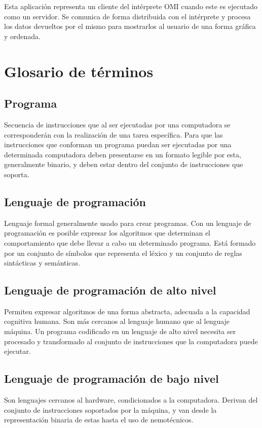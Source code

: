 Esta aplicación representa un cliente del intérprete OMI cuando este es ejecutado como un servidor. Se comunica de forma distribuida con el intérprete y procesa los datos devueltos por el mismo
para mostrarlos al usuario de una forma gráfica y ordenada.   

\section{Glosario de términos}
\subsection{Programa}
Secuencia de instrucciones que al ser ejecutadas por una computadora se corresponderán con
la realización de una tarea específica. Para que las instrucciones que conforman un programa puedan ser ejecutadas 
por una determinada computadora deben presentarse en un formato legible por esta, generalmente binario, y deben estar dentro
del conjunto de instrucciones que soporta. 

\subsection{Lenguaje de programación}
Lenguaje formal generalmente usado para crear programas. Con un lenguaje de programación es posible expresar los 
algoritmos que determinan el comportamiento que debe llevar a cabo un determinado programa. Está formado por
un conjunto de símbolos que representa el léxico y un conjunto de reglas sintácticas y semánticas. 

\subsection{Lenguaje de programación de alto nivel}
Permiten expresar algoritmos de una forma abstracta, adecuada a la capacidad cognitiva humana. Son más cercanos
al lenguaje humano que al lenguaje máquina. Un programa codificado en un lenguaje de alto nivel necesita ser procesado 
y transformado al conjunto de instrucciones que la computadora puede ejecutar. 

\subsection{Lenguaje de programación de bajo nivel}
Son lenguajes cercanos al hardware, condicionados a la computadora. Derivan del conjunto de instrucciones 
soportados por la máquina, y van desde la representación binaria de estas hasta el uso de nemotécnicos.

